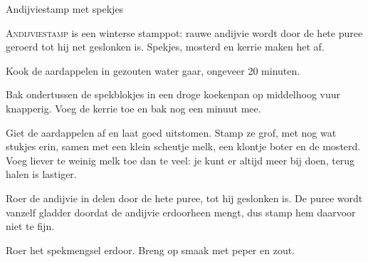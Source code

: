 \begin{recipe}{Andijviestamp met spekjes}


\lettrine{A}{ndijviestamp} is een winterse stamppot: rauwe andijvie wordt
door de hete puree geroerd tot hij net geslonken is. Spekjes, mosterd en
kerrie maken het af.

\begin{ingredients}
\end{ingredients}

\begin{steps}
  \item Kook de aardappelen in gezouten water gaar, ongeveer 20 minuten.
  \item Bak ondertussen de spekblokjes in een droge koekenpan op middelhoog
        vuur knapperig. Voeg de kerrie toe en bak nog een minuut mee.
  \item Giet de aardappelen af en laat goed uitstomen. Stamp ze grof, met
        nog wat stukjes erin, samen met een klein scheutje melk, een
        klontje boter en de mosterd. Voeg liever te weinig melk toe dan te
        veel: je kunt er altijd meer bij doen, terug halen is lastiger.
  \item Roer de andijvie in delen door de hete puree, tot hij geslonken
        is. De puree wordt vanzelf gladder doordat de andijvie erdoorheen
        mengt, dus stamp hem daarvoor niet te fijn.
  \item Roer het spekmengsel erdoor. Breng op smaak met peper en zout.
\end{steps}
\end{recipe}
